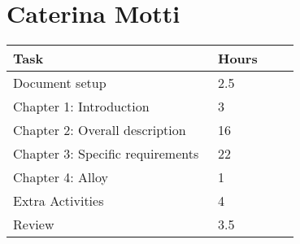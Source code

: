 \section{Caterina Motti}
\begin{center}
	\begin{tabular}{@{}p{0.5\linewidth} p{0.2\linewidth}@{}}
		\hline
		\textbf{Task} & \textbf{Hours} \\ \hline
            Document setup & 2.5 \\ \hline
            Chapter 1: Introduction & 3 \\ \hline
            Chapter 2: Overall description & 16 \\ \hline
            Chapter 3: Specific requirements & 22 \\ \hline
            Chapter 4: Alloy & 1 \\ \hline
            Extra Activities & 4 \\ \hline
            Review & 3.5 \\ \hline
	\end{tabular}
\end{center}
